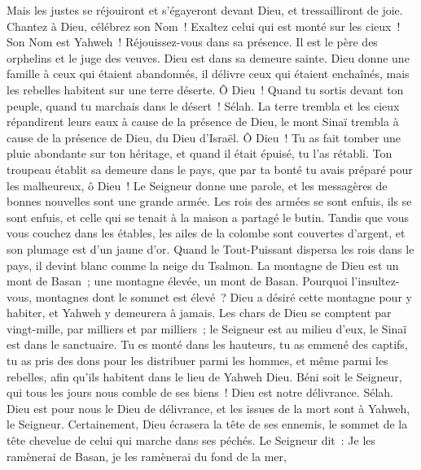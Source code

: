 \begin{multicols}{2}
Mais les justes se réjouiront et s'égayeront devant Dieu, et tressailliront de joie.
Chantez à Dieu, célébrez son Nom~! Exaltez celui qui est monté sur les cieux~! Son Nom est Yahweh~! Réjouissez-vous dans sa présence.
Il est le père des orphelins et le juge des veuves. Dieu est dans sa demeure sainte.
Dieu donne une famille à ceux qui étaient abandonnés, il délivre ceux qui étaient enchaînés, mais les rebelles habitent sur une terre déserte.
Ô Dieu~! Quand tu sortis devant ton peuple, quand tu marchais dans le désert~! Sélah.
La terre trembla et les cieux répandirent leurs eaux à cause de la présence de Dieu, le mont Sinaï trembla à cause de la présence de Dieu, du Dieu d'Israël.
Ô Dieu~! Tu as fait tomber une pluie abondante sur ton héritage, et quand il était épuisé, tu l'as rétabli.
Ton troupeau établit sa demeure dans le pays, que par ta bonté tu avais préparé pour les malheureux, ô Dieu~!
Le Seigneur donne une parole, et les messagères de bonnes nouvelles sont une grande armée.
Les rois des armées se sont enfuis, ils se sont enfuis, et celle qui se tenait à la maison a partagé le butin.
Tandis que vous vous couchez dans les étables, les ailes de la colombe sont couvertes d'argent, et son plumage est d'un jaune d'or.
Quand le Tout-Puissant dispersa les rois dans le pays, il devint blanc comme la neige du Tsalmon.
La montagne de Dieu est un mont de Basan~; une montagne élevée, un mont de Basan.
Pourquoi l'insultez-vous, montagnes dont le sommet est élevé~? Dieu a désiré cette montagne pour y habiter, et Yahweh y demeurera à jamais.
Les chars de Dieu se comptent par vingt-mille, par milliers et par milliers~; le Seigneur est au milieu d'eux, le Sinaï est dans le sanctuaire.
Tu es monté dans les hauteurs, tu as emmené des captifs, tu as pris des dons pour les distribuer parmi les hommes, et même parmi les rebelles, afin qu'ils habitent dans le lieu de Yahweh Dieu.
Béni soit le Seigneur, qui tous les jours nous comble de ses biens~! Dieu est notre délivrance. Sélah.
Dieu est pour nous le Dieu de délivrance, et les issues de la mort sont à Yahweh, le Seigneur.
Certainement, Dieu écrasera la tête de ses ennemis, le sommet de la tête chevelue de celui qui marche dans ses péchés.
Le Seigneur dit~: Je les ramènerai de Basan, je les ramènerai du fond de la mer,

\end{multicols}
